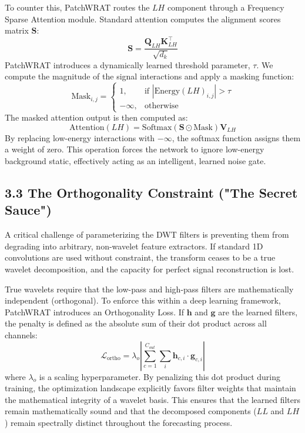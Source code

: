 \documentclass[11pt, letterpaper]{article}
\begin{document}
To counter this, PatchWRAT routes the $LH$ component through a Frequency Sparse Attention module. Standard attention computes the alignment scores matrix $\mathbf{S}$:
\begin{equation}
    \mathbf{S} = \frac{\mathbf{Q}_{LH} \mathbf{K}_{LH}^\top}{\sqrt{d_k}}
\end{equation}
PatchWRAT introduces a dynamically learned threshold parameter, $\tau$. We compute the magnitude of the signal interactions and apply a masking function:
\begin{equation}
    \text{Mask}_{i,j} = 
    \begin{cases} 
      1, & \text{if } |\text{Energy}(LH)_{i,j}| > \tau \\
      -\infty, & \text{otherwise}
    \end{cases}
\end{equation}
The masked attention output is then computed as:
\begin{equation}
    \text{Attention}(LH) = \text{Softmax}(\mathbf{S} \odot \text{Mask}) \mathbf{V}_{LH}
\end{equation}
By replacing low-energy interactions with $-\infty$, the softmax function assigns them a weight of zero. This operation forces the network to ignore low-energy background static, effectively acting as an intelligent, learned noise gate.

\subsection{3.3 The Orthogonality Constraint ("The Secret Sauce")}
A critical challenge of parameterizing the DWT filters is preventing them from degrading into arbitrary, non-wavelet feature extractors. If standard 1D convolutions are used without constraint, the transform ceases to be a true wavelet decomposition, and the capacity for perfect signal reconstruction is lost.

True wavelets require that the low-pass and high-pass filters are mathematically independent (orthogonal). To enforce this within a deep learning framework, PatchWRAT introduces an Orthogonality Loss. If $\mathbf{h}$ and $\mathbf{g}$ are the learned filters, the penalty is defined as the absolute sum of their dot product across all channels:
\begin{equation}
    \mathcal{L}_{\text{ortho}} = \lambda_o \left| \sum_{c=1}^{C_{out}} \sum_{i} \mathbf{h}_{c,i} \cdot \mathbf{g}_{c,i} \right|
\end{equation}
where $\lambda_o$ is a scaling hyperparameter. By penalizing this dot product during training, the optimization landscape explicitly favors filter weights that maintain the mathematical integrity of a wavelet basis. This ensures that the learned filters remain mathematically sound and that the decomposed components ($LL$ and $LH$) remain spectrally distinct throughout the forecasting process.
\end{document}
